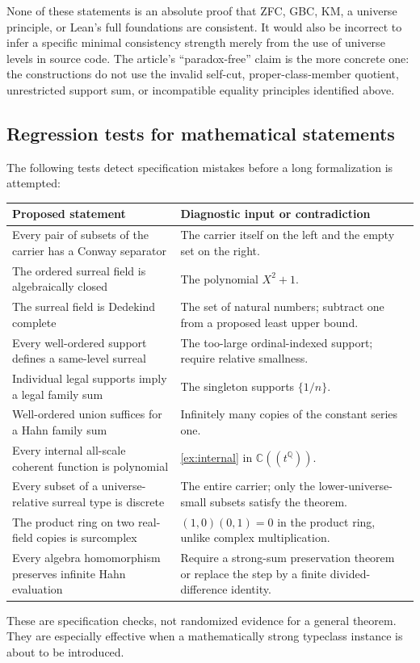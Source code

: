\documentclass[11pt,letterpaper]{article}
\numberwithin{equation}{section}
\theoremstyle{definition}
\theoremstyle{remark}
\newcommand{\C}{\mathbb C}
\newcommand{\Q}{\mathbb Q}
\begin{document}
None of these statements is an absolute proof that ZFC, GBC, KM, a universe principle, or Lean's full foundations are consistent. It would also be incorrect to infer a specific minimal consistency strength merely from the use of universe levels in source code. The article's ``paradox-free'' claim is the more concrete one: the constructions do not use the invalid self-cut, proper-class-member quotient, unrestricted support sum, or incompatible equality principles identified above.

\subsection{Regression tests for mathematical statements}
The following tests detect specification mistakes before a long formalization is attempted:
\begin{longtable}{@{}P{0.34\textwidth}P{0.57\textwidth}@{}}
\toprule
Proposed statement & Diagnostic input or contradiction\\
\midrule\endhead
Every pair of subsets of the carrier has a Conway separator & The carrier itself on the left and the empty set on the right.\\[0.45em]
The ordered surreal field is algebraically closed & The polynomial $X^2+1$.\\[0.45em]
The surreal field is Dedekind complete & The set of natural numbers; subtract one from a proposed least upper bound.\\[0.45em]
Every well-ordered support defines a same-level surreal & The too-large ordinal-indexed support; require relative smallness.\\[0.45em]
Individual legal supports imply a legal family sum & The singleton supports $\{1/n\}$.\\[0.45em]
Well-ordered union suffices for a Hahn family sum & Infinitely many copies of the constant series one.\\[0.45em]
Every internal all-scale coherent function is polynomial & \cref{ex:internal} in $\C((t^\Q))$.\\[0.45em]
Every subset of a universe-relative surreal type is discrete & The entire carrier; only the lower-universe-small subsets satisfy the theorem.\\[0.45em]
The product ring on two real-field copies is surcomplex & $(1,0)(0,1)=0$ in the product ring, unlike complex multiplication.\\[0.45em]
Every algebra homomorphism preserves infinite Hahn evaluation & Require a strong-sum preservation theorem or replace the step by a finite divided-difference identity.\\
\bottomrule
\end{longtable}
These are specification checks, not randomized evidence for a general theorem. They are especially effective when a mathematically strong typeclass instance is about to be introduced.
\end{document}
